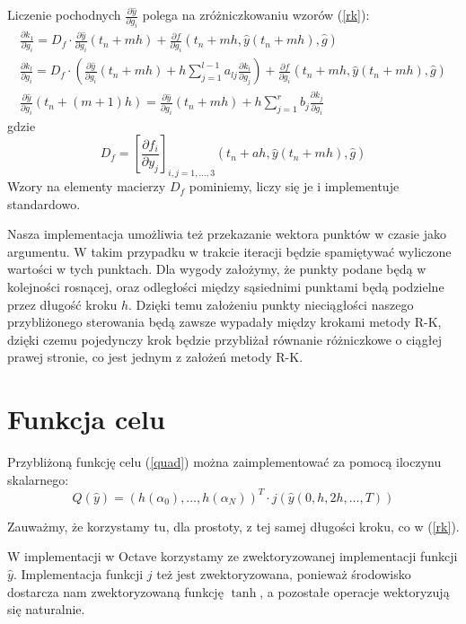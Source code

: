 \documentclass[licencjacka]{pracamgr}
\begin{document}
Liczenie pochodnych $\frac{\partial \hat{y}}{\partial g_i}$ polega na zróżniczkowaniu wzorów (\ref{rk}):
\begin{gather}
    \frac{\partial k_1}{\partial g_i} = D_f \cdot \frac{\partial \hat{y}}{\partial g_i}(t_n + mh) + \frac{\partial f}{\partial g_i}(t_n + mh, \hat{y}(t_n + mh), \hat{g}) \nonumber \\
    \frac{\partial k_l}{\partial g_i}  = D_f \cdot \left(\frac{\partial \hat{y}}{\partial g_i}(t_n + mh) + h\sum_{j=1}^{l-1} a_{lj}\frac{\partial k_i}{\partial g_j} \right) + \frac{\partial f}{\partial g_i}(t_n + mh, \hat{y}(t_n + mh), \hat{g})  \label{drk}\\
    \frac{\partial \hat{y}}{\partial g_i}(t_n + (m+1)h) = \frac{\partial \hat{y}}{\partial g_i}(t_n + mh) + h\sum_{j=1}^r b_j \frac{\partial k_j}{\partial g_i} \nonumber
\end{gather}
gdzie
\begin{equation} \label{Df}
  D_f = {\left[\frac{\partial f_i}{\partial y_j}\right]}_{i,j = 1,\ldots, 3} (t_n + ah, \hat{y}(t_n + mh), \hat{g})
\end{equation}
Wzory na elementy macierzy $D_f$ pominiemy, liczy się je i implementuje standardowo.

Nasza implementacja umożliwia też przekazanie wektora punktów w czasie jako argumentu. W takim przypadku w trakcie iteracji będzie spamiętywać wyliczone wartości w tych punktach. Dla wygody założymy, że punkty podane będą w kolejności rosnącej, oraz odległości między sąsiednimi punktami będą podzielne przez długość kroku $h$. Dzięki temu założeniu punkty nieciągłości naszego przybliżonego sterowania będą zawsze wypadały między krokami metody R-K, dzięki czemu pojedynczy krok będzie przybliżał równanie różniczkowe o ciągłej prawej stronie, co jest jednym z założeń metody R-K.

\section{Funkcja celu}
Przybliżoną funkcję celu (\ref{quad}) można zaimplementować za pomocą iloczynu skalarnego:
\begin{equation}
  Q(\hat{y}) = {\left(h(\alpha_0),\ldots,h(\alpha_N)\right)}^T \cdot {j(\hat{y}(0, h, 2h, \ldots, T))}
\end{equation}

Zauważmy, że korzystamy tu, dla prostoty, z tej samej długości kroku, co w (\ref{rk}).

W implementacji w Octave korzystamy ze zwektoryzowanej implementacji funkcji $\hat{y}$. Implementacja funkcji $j$ też jest zwektoryzowana, ponieważ środowisko dostarcza nam zwektoryzowaną funkcję $\tanh$, a pozostałe operacje wektoryzują się naturalnie.
\end{document}
